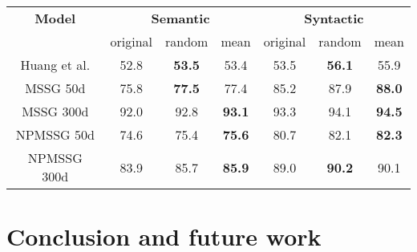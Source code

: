 \documentclass[11pt]{article}
\begin{document}
 \begin{center}
 \begin{tabular}{|c|ccc|ccc|}
 \hline
 \multirow{1}{*}{\textbf{Model}} &\multicolumn{3}{c}{\textbf{Semantic}} & \multicolumn{3}{|c|}{\textbf{Syntactic}}  \\
 & original & random & mean & original & random & mean \\
 \hline 
 Huang et al.  & 52.8 & \textbf{53.5} & 53.4 & 53.5 & \textbf{56.1} & 55.9\\
 MSSG 50d & 75.8  & \textbf{77.5}  & 77.4 & 85.2 & 87.9 & \textbf{88.0}\\
 MSSG 300d & 92.0 & 92.8 & \textbf{93.1} & 93.3& 94.1& \textbf{94.5}\\
 NPMSSG 50d & 74.6 & 75.4 & \textbf{75.6} & 80.7 & 82.1 & \textbf{82.3}\\
 NPMSSG 300d & 83.9 & 85.7 & \textbf{85.9} & 89.0 & \textbf{90.2} & 90.1\\
 \hline
 \end{tabular}
 \end{center}
 
\section{Conclusion and future work}
\end{document}
